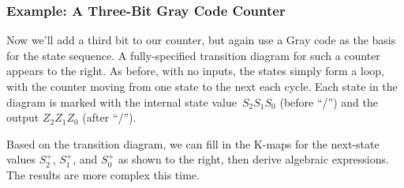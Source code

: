 \hspace{0.25in}\begin{minipage}{3in}
\end{minipage}\hspace{.5in}%
\begin{minipage}{0.625in}
\vspace{20pt}

\end{minipage}\hspace{.325in}\begin{minipage}{1.6in}
\end{minipage}\vspace{12pt}

\subsubsection{Example: A Three-Bit Gray Code Counter}

\begin{minipage}{3.25in}
Now we'll add a third bit to our counter, but again use a Gray code
as the basis for the state sequence.
%
A fully-specified transition diagram for such a counter appears to 
the right.  As before, with no inputs, the states simply form a loop, 
with the counter moving from one state to the next each cycle.
%
Each state in the diagram is marked with the internal state value~$S_2S_1S_0$ 
(before ``/'') and the output $Z_2Z_1Z_0$ (after ``/''). 
\end{minipage}\hspace{.25in}%
\begin{minipage}{3in}
\end{minipage}

\begin{minipage}{2.75in}
Based on the transition diagram, we can fill in the K-maps for the 
next-state values $S_2^+$, $S_1^+$, and $S_0^+$ as shown to the right, then 
derive algebraic expressions.  The results are more complex this 
time.
\end{minipage}\hspace{.25in}%
\begin{minipage}{1.00in}
\end{minipage}\hspace{.25in}\begin{minipage}{1.00in}
\end{minipage}\hspace{.25in}\begin{minipage}{1.00in}
\end{minipage}

